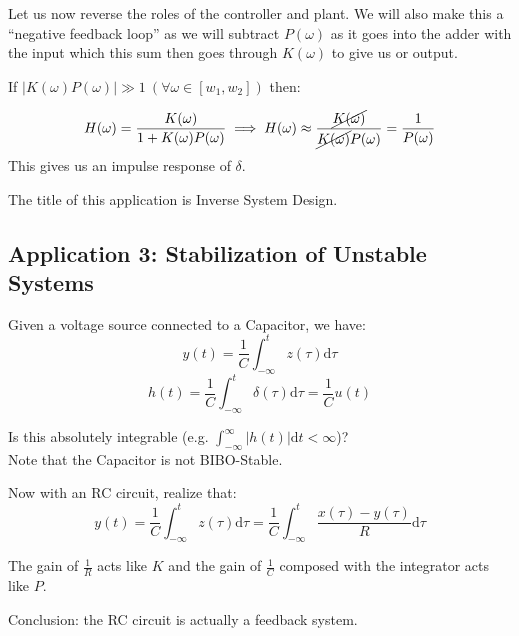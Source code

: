 Let us now reverse the roles of the controller and plant. We will also make this a ``negative feedback loop'' as we will subtract $P(\omega)$ as it goes into the adder with the input which this sum then goes through $K(\omega)$ to give us or output.

If $|K(\omega)P(\omega)|\gg1\ (\forall\omega\in[w_1, w_2])$ then:

\[
    H(\omega) = \frac{K(\omega)}{1+K(\omega)P(\omega)}
    \implies
    H(\omega) \approx \frac{\cancel{K(\omega)}}{\cancel{K(\omega)}P(\omega)}=\frac1{P(\omega)}
\]
This gives us an impulse response of $\delta$.

The title of this application is Inverse System Design.

\subsection{Application 3: Stabilization of Unstable Systems}
Given a voltage source connected to a Capacitor, we have:
\[
    y(t)=\frac1C\int_{-\infty}^t z(\tau)\mathrm d\tau
\]
\[
    h(t)=\frac1C\int_{-\infty}^t 
    \delta(\tau)\mathrm d\tau
    =\frac1C u(t)
\]

Is this absolutely integrable (e.g. $\int_{-\infty}^\infty |h(t)|\mathrm d t< \infty$)?\\
Note that the Capacitor is not BIBO-Stable.

Now with an RC circuit, realize that:
\[
    y(t)=\frac1C\int_{-\infty}^t z(\tau)\mathrm d\tau
    =\frac1C\int_{-\infty}^t \frac{x(\tau)-y(\tau)}{R}\mathrm d\tau
\]

The gain of $\frac1R$ acts like $K$ and the gain of $\frac1C$ composed with the integrator acts like $P$.

Conclusion: the RC circuit is actually a feedback system.
